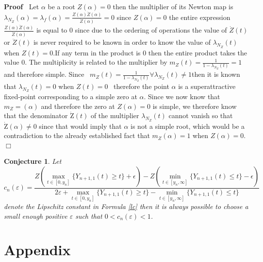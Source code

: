 \documentclass{elsarticle}
\newcommand{\Zeta}{\mathrm{Z}}
\newenvironment{proof}{\noindent\textbf{Proof\ }}{\hspace*{\fill}$\Box$\medskip}
\newtheorem{conjecture}{Conjecture}
\begin{document}
\begin{proof}
  Let $\alpha$ be a root $Z (\alpha) = 0$ then the multiplier of its Newton
  map is $\lambda_{N_Z} (\alpha) = \lambda_f (\alpha) = \frac{Z (\alpha)
  \ddot{Z} (\alpha)}{\dot{Z} (\alpha)} = 0$ since $Z (\alpha) = 0$ the entire
  expression $\frac{Z (\alpha) \ddot{Z} (\alpha)}{\dot{Z} (\alpha)}$ is equal
  to 0 since due to the ordering of operations the value of $\dot{Z} (t)$ or
  $\ddot{Z} (t)$ is never required to be known in order to know the value of
  $\lambda_{N_Z} (t)$ when $Z (t) = 0$.\quad If any term in the product is 0
  then the entire product takes the value 0. The multiplicity is related to
  the multiplier by $m_Z (t) = \frac{1}{1 - \lambda_{N_Z} (t)} = 1$ and
  therefore simple. Since \ $m_Z (t) = \frac{1}{1 - \lambda_{N_Z} (t)} \forall
  \lambda_{N_Z} (t) \neq 1$then it is known that $\lambda_{N_Z} (t) = 0$ when
  $Z (t_{}) = 0$ \ therefore the point $\alpha$ is a superattractive
  fixed-point corresponding to a simple zero at $\alpha$. Since we now know
  that $m_Z = (\alpha)$ and therefore the zero at $Z (\alpha) = 0$ is simple,
  we therefore know that the denominator $\dot{\Zeta} (t)$ of the multiplier
  $\lambda_{N_Z} (t)$ cannot vanish so that \ \ $\dot{\Zeta} (\alpha) \neq 0$
  since that would imply that $\alpha$ is not a simple root, which would be a
  contradiction to the already established fact that $m_Z (\alpha) = 1$ when
  $Z (\alpha) = 0$.
\end{proof}

\begin{conjecture}
  Let
  \begin{equation}
    c_n (\varepsilon) = \frac{Z (\max_{t \in [0, y_n]} \{ Y_{n + 1, 1} (t)
    \geqslant t \} + \epsilon) - Z (\min_{t \in [y_n, \infty]} \{ Y_{n + 1, 1}
    (t) \leqslant t \} - \epsilon)}{2 \varepsilon + \max_{t \in [0, y_n]} \{
    Y_{n + 1, 1} (t) \geqslant t \} - \min_{t \in [y_n, \infty]} \{ Y_{n + 1,
    1} (t) \leqslant t \}}
  \end{equation}
  denote the Lipschitz constant in Formula \ref{lc} then it is always possible
  to choose a small enough positive $\varepsilon$ such that $0 < c_n
  (\varepsilon) < 1$.
\end{conjecture}

\section{Appendix}
\end{document}
